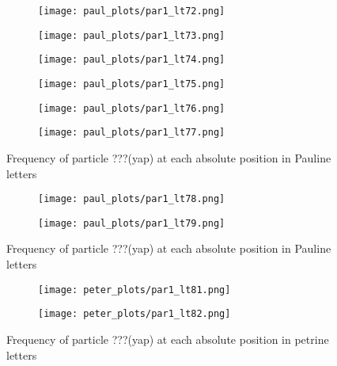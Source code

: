 \documentclass[a4paper]{article}
\begin{document}
\begin{figure}
\ContinuedFloat
\begin{subfigure}{0.45\textwidth}
\centering
\texttt{[image: paul\_plots/par1\_lt72.png]}
\end{subfigure}
\begin{subfigure}{0.45\textwidth}
\centering
\texttt{[image: paul\_plots/par1\_lt73.png]}
\end{subfigure}
\begin{subfigure}{0.45\textwidth}
\centering
\texttt{[image: paul\_plots/par1\_lt74.png]}
\end{subfigure}
\begin{subfigure}{0.45\textwidth}
\centering
\texttt{[image: paul\_plots/par1\_lt75.png]}
\end{subfigure}
\begin{subfigure}{0.45\textwidth}
\centering
\texttt{[image: paul\_plots/par1\_lt76.png]}
\end{subfigure}
\begin{subfigure}{0.45\textwidth}
\centering
\texttt{[image: paul\_plots/par1\_lt77.png]}
\end{subfigure}
\caption{Frequency of particle ???(yap) at each absolute position in Pauline letters}
\end{figure}

\begin{figure}
\ContinuedFloat
\begin{subfigure}{0.45\textwidth}
\centering
\texttt{[image: paul\_plots/par1\_lt78.png]}
\end{subfigure}
\begin{subfigure}{0.45\textwidth}
\centering
\texttt{[image: paul\_plots/par1\_lt79.png]}
\end{subfigure}
\caption{Frequency of particle ???(yap) at each absolute position in Pauline letters}
\end{figure}

\begin{figure}
\begin{subfigure}{0.45\textwidth}
\centering
\texttt{[image: peter\_plots/par1\_lt81.png]}
\end{subfigure}
\begin{subfigure}{0.45\textwidth}
\centering
\texttt{[image: peter\_plots/par1\_lt82.png]}
\end{subfigure}
\caption{Frequency of particle ???(yap) at each absolute position in petrine letters}
\label{peter_yap}
\end{figure}
\end{document}
